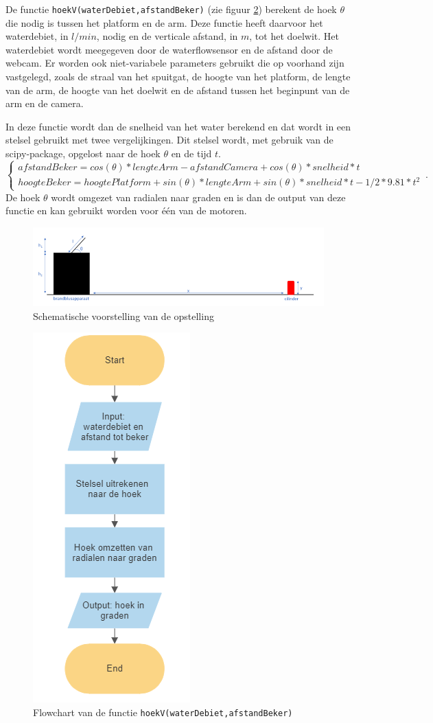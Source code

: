 \documentclass[kulak]{kulakarticle} %
\begin{document}
			De functie \verb*|hoekV(waterDebiet,afstandBeker)| (zie figuur \ref{flowchart_water}) berekent de hoek \(\theta\)  die nodig is tussen het platform en de arm. Deze functie heeft daarvoor het waterdebiet, in \(l/min\), nodig en de verticale afstand, in \(m\), tot het doelwit. Het waterdebiet wordt meegegeven door de waterflowsensor en de afstand door de webcam. Er worden ook niet-variabele parameters gebruikt die op voorhand zijn vastgelegd, zoals de straal van het spuitgat, de hoogte van het platform, de lengte van de arm, de hoogte van het doelwit en de afstand tussen het beginpunt van de arm en de camera. 

			In deze functie wordt dan de snelheid van het water berekend en dat wordt in een stelsel gebruikt met twee vergelijkingen. Dit stelsel wordt, met gebruik van de scipy-package, opgelost naar de hoek \(\theta\) en de tijd \(t\).
				\begin{equation}
					\begin{cases}
						afstandBeker  = cos(\theta )*lengteArm - afstandCamera + cos(\theta )*snelheid*t \\ 
						hoogteBeker  =  hoogtePlatform + sin(\theta )*lengteArm + sin(\theta )*snelheid*t - 1/2*9.81*t^2
					\end{cases}\,.
				\end{equation}
			De hoek \(\theta\) wordt omgezet van radialen naar graden en is dan de output van deze functie en kan gebruikt worden voor één van de motoren.

				\begin{figure} [h!]
					\centering
					\includegraphics[width = 1 \textwidth]{schematische voorstelling water LATEX}
					\caption{Schematische voorstelling van de opstelling}
					\label{schematische voorstelling}
				\end{figure}

				\begin{figure} [h!]
					\centering
					\includegraphics[width = .2 \textwidth]{flowchart_hoekV}
				\cprotect\caption{Flowchart van de functie \verb*|hoekV(waterDebiet,afstandBeker)|}
					\label{flowchart_water}
				\end{figure}
\end{document}
